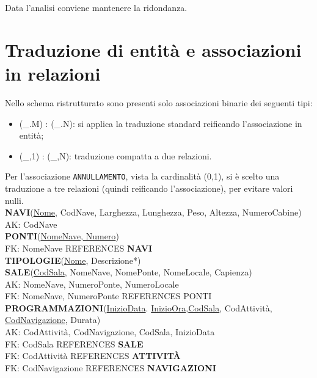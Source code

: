 \documentclass[a4paper, titlepage]{report}
\begin{document}
\noindent
Data l'analisi conviene mantenere la ridondanza.

\newpage
\section*{Traduzione di entità e associazioni in relazioni}

Nello schema ristrutturato sono presenti solo associazioni binarie dei seguenti tipi:
\begin{itemize}
    \item (\_.M) : (\_.N): si applica la traduzione standard reificando l'associazione in entità;
    \item (\_,1) : (\_,N): traduzione compatta a due relazioni.
\end{itemize}
Per l'associazione \texttt{ANNULLAMENTO}, vista la cardinalità (0,1), si è scelto una traduzione a tre relazioni (quindi reificando l'associazione), per evitare valori nulli. \\

\noindent
\textbf{NAVI}(\underline{Nome}, CodNave, Larghezza, Lunghezza, Peso, Altezza, NumeroCabine)\\
AK: CodNave\\

\noindent
\textbf{PONTI}(\underline{NomeNave, Numero}) \\ 
FK: NomeNave REFERENCES \textbf{NAVI} \\

\noindent
\textbf{TIPOLOGIE}(\underline{Nome}, Descrizione*) \\

\noindent
\textbf{SALE}(\underline{CodSala}, NomeNave, NomePonte, NomeLocale, Capienza) \\
AK: NomeNave, NumeroPonte, NumeroLocale \\
FK: NomeNave, NumeroPonte REFERENCES PONTI \\

\noindent
\textbf{PROGRAMMAZIONI}(\underline{InizioData}. \underline{InizioOra},\underline{CodSala}, CodAttività, \underline{CodNavigazione}, Durata) \\ 
AK: CodAttività, CodNavigazione, CodSala, InizioData\\
FK: CodSala REFERENCES \textbf{SALE}\\
FK: CodAttività REFERENCES \textbf{ATTIVITÀ}\\
FK: CodNavigazione REFERENCES \textbf{NAVIGAZIONI}\\
\end{document}
